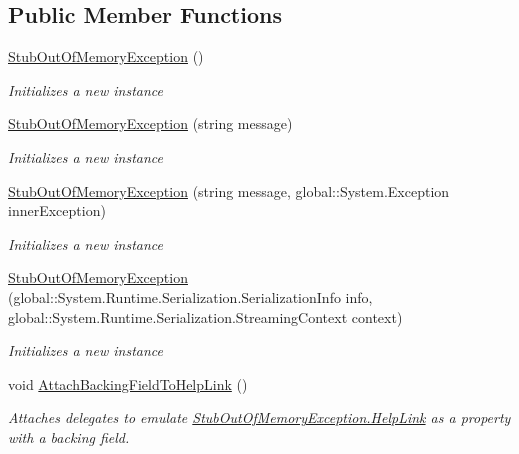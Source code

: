 \subsection*{Public Member Functions}
\begin{DoxyCompactItemize}
\item 
\hyperlink{class_system_1_1_fakes_1_1_stub_out_of_memory_exception_a03432fc9a44b8420f860c5ad64e07e15}{Stub\-Out\-Of\-Memory\-Exception} ()
\begin{DoxyCompactList}\small\item\em Initializes a new instance\end{DoxyCompactList}\item 
\hyperlink{class_system_1_1_fakes_1_1_stub_out_of_memory_exception_af5bd69bc62caa6bd1f059deaaf1cbcf3}{Stub\-Out\-Of\-Memory\-Exception} (string message)
\begin{DoxyCompactList}\small\item\em Initializes a new instance\end{DoxyCompactList}\item 
\hyperlink{class_system_1_1_fakes_1_1_stub_out_of_memory_exception_abee014df9b71226fe9f1282077cb40a0}{Stub\-Out\-Of\-Memory\-Exception} (string message, global\-::\-System.\-Exception inner\-Exception)
\begin{DoxyCompactList}\small\item\em Initializes a new instance\end{DoxyCompactList}\item 
\hyperlink{class_system_1_1_fakes_1_1_stub_out_of_memory_exception_adb92678f36d58b3b6a56ea19f786603c}{Stub\-Out\-Of\-Memory\-Exception} (global\-::\-System.\-Runtime.\-Serialization.\-Serialization\-Info info, global\-::\-System.\-Runtime.\-Serialization.\-Streaming\-Context context)
\begin{DoxyCompactList}\small\item\em Initializes a new instance\end{DoxyCompactList}\item 
void \hyperlink{class_system_1_1_fakes_1_1_stub_out_of_memory_exception_ad938da16775017782a807f883929d18b}{Attach\-Backing\-Field\-To\-Help\-Link} ()
\begin{DoxyCompactList}\small\item\em Attaches delegates to emulate \hyperlink{class_system_1_1_fakes_1_1_stub_out_of_memory_exception_a0d1dee7a0650597391ff1f4a56844261}{Stub\-Out\-Of\-Memory\-Exception.\-Help\-Link} as a property with a backing field.\end{DoxyCompactList}\item 

\end{DoxyCompactItemize}
